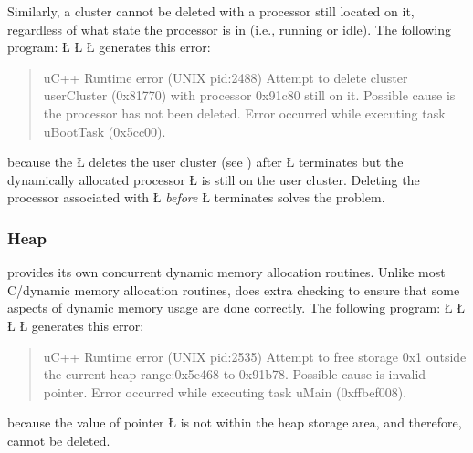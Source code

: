\documentclass[openright,twoside]{report}
\begin{document}
Similarly, a cluster cannot be deleted with a processor still located on it, regardless of what state the processor is in (i.e., running or idle).
The following program:
\LGinlinefalse\LGbegin\lgrinde
\L{}
\L{\LB{}}
\L{\LB{\}}}
\endlgrinde\LGend
generates this error:
\begin{quote}
\BGfont
uC++ Runtime error (UNIX pid:2488) Attempt to delete cluster userCluster (0x81770) with processor 0x91c80 still on it.
Possible cause is the processor has not been deleted.
Error occurred while executing task uBootTask (0x5cc00).
\end{quote}
because the \LGinlinetrue\LGbegin\lgrinde\L{}\endlgrinde\LGend{} deletes the user cluster (see ) after \LGinlinetrue\LGbegin\lgrinde\L{}\endlgrinde\LGend{} terminates but the dynamically allocated processor \LGinlinetrue\LGbegin\lgrinde\L{}\endlgrinde\LGend{} is still on the user cluster.
Deleting the processor associated with \LGinlinetrue\LGbegin\lgrinde\L{}\endlgrinde\LGend{} \emph{before} \LGinlinetrue\LGbegin\lgrinde\L{}\endlgrinde\LGend{} terminates solves the problem.


\subsubsection{Heap}
\label{s:Heap}

\uC provides its own concurrent dynamic memory allocation routines.
Unlike most C/\CC dynamic memory allocation routines, \uC does extra checking to ensure that some aspects of dynamic memory usage are done correctly.
The following program:
\LGinlinefalse\LGbegin\lgrinde
\L{}
\L{\LB{}}
\CE{}\L{\LB{}}
\L{\LB{\}}}
\endlgrinde\LGend
generates this error:
\begin{quote}
\BGfont
uC++ Runtime error (UNIX pid:2535) Attempt to free storage 0x1 outside the current heap range:0x5e468 to 0x91b78.
Possible cause is invalid pointer.
Error occurred while executing task uMain (0xffbef008).
\end{quote}
because the value of pointer \LGinlinetrue\LGbegin\lgrinde\L{}\endlgrinde\LGend{} is not within the heap storage area, and therefore, cannot be deleted.
\end{document}
